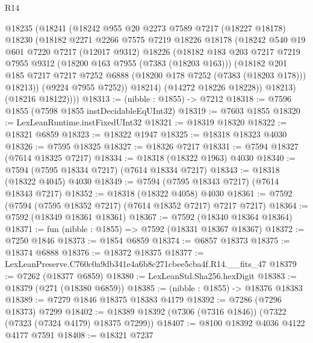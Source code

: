 \begin{lexlean}{R14}
\begin{coremodule}
        @18235
          (@18241
            (@18242
              @955
              @20
              @2273
              @7589
              @7217
              (@18227 @18178)
              @18230
              (@18182
                @2271
                @2266
                @7575
                @7219
                @18226
                @18178
                (@18242
                  @540
                  @19
                  @601
                  @7220
                  @7217
                  (@12017 @9312)
                  @18226
                  (@18182
                    @183
                    @203
                    @7217
                    @7219
                    @7955
                    @9312
                    (@18200 @163 @7955 (@7383 (@18203 @163)))
                    (@18182
                      @201
                      @185
                      @7217
                      @7217
                      @7252
                      @6888
                      (@18200 @178 @7252 (@7383 (@18203 @178)))
                      @18213))
                  (@9224 @7955 @7252))
                @18214)
              (@14272 @18226 @18228))
            @18213)
          (@18216 @18122))))
@18313 := (nibble : @1855) -> @7212
@18318 := @7596 @1855 (@7598 @1855 instDecidableEqUInt32)
@18319 := @7603 @1855
@18320 := LexLeanRuntime.instFixedUInt32
@18321 := @18319 @18320
@18322 := @18321 @6859
@18323 := @18322 @1947
@18325 := @18318 @18323 @4030
@18326 := @7595 @18325
@18327 := @18326 @7217
@18331 := @7594 @18327 (@7614 @18325 @7217)
@18334 := @18318 (@18322 @1963) @4030
@18340 := @7594 (@7595 @18334 @7217) (@7614 @18334 @7217)
@18343 := @18318 (@18322 @4045) @4030
@18349 := @7594 (@7595 @18343 @7217) (@7614 @18343 @7217)
@18352 := @18318 (@18322 @4058) @4030
@18361 := @7592 (@7594 (@7595 @18352 @7217) (@7614 @18352 @7217) @7217 @7217)
@18364 := @7592 (@18349 @18361 @18361)
@18367 := @7592 (@18340 @18364 @18364)
@18371 := fun (nibble : @1855) => @7592 (@18331 @18367 @18367)
@18372 := @7250 @1846
@18373 := @1854 @6859
@18374 := @6857 @18373
@18375 := @18374 @6888
@18376 := @18372 @18375
@18377 := LexLeanPreserve.C760c0a9db341e4a6b8c271cbee5cba4f.R14.__fits_47
@18379 := @7262 (@18377 @6859)
@18380 := LexLeanStd.Sha256.hexDigit
@18383 := @18379 (@271 (@18380 @6859))
@18385 := (nibble : @1855) -> @18376 @18383
@18389 := @7279 @1846 @18375 @18383 @4179
@18392 := @7286 (@7296 @18373) @7299
@18402 := @18389 @18392 (@7306 (@7316 @1846)) (@7322 (@7323 (@7324 @4179) @18375 @7299))
@18407 := @8100 @18392 @4036 @4122 @4177 @7591
@18408 := @18321 @7237

\end{coremodule}
\end{lexlean}
